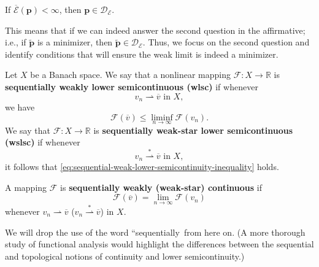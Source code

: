 \begin{Lemma}
\label{lem:elasticity-finite-extended-energy-admissibility}
If $\overline{\mathcal{E}}(\bm{p})<\infty$, then $\bm{p}\in\mathcal{D}_{\mathcal{E}}$.
\end{Lemma}

This means that if we can indeed answer the second question in the affirmative; i.e., if $\widetilde{\bm{p}}$ is a minimizer, then $\widetilde{\bm{p}}\in\mathcal{D}_{\mathcal{E}}$. Thus, we focus on the second question and identify conditions that will ensure the weak limit is indeed a minimizer.

\begin{Definition}
\label{def:sequential-weak-semicontinuity-and-continuity}
Let $X$ be a Banach space. We say that a nonlinear mapping $\mathcal{F}:X\to\mathbb{R}$ is \textbf{sequentially weakly lower semicontinuous (wlsc)} if whenever
\begin{equation}\label{eq:sequential-weak-lower-semicontinuity-sequence}
v_n\rightharpoonup\overline v\text{ in }X,
\end{equation}
we have
\begin{equation}\label{eq:sequential-weak-lower-semicontinuity-inequality}
\mathcal{F}(\overline v)\leq\liminf_{n\to\infty}\mathcal{F}(v_n).
\end{equation}
We say that $\mathcal{F}:X\to\mathbb{R}$ is \textbf{sequentially weak-star lower semicontinuous (wslsc)} if whenever
\begin{equation}\label{eq:sequential-weak-star-lower-semicontinuity-sequence}
v_n\overset{*}{\rightharpoonup}\overline v\text{ in }X,
\end{equation}
it follows that \eqref{eq:sequential-weak-lower-semicontinuity-inequality} holds.

A mapping $\mathcal{F}$ is \textbf{sequentially weakly (weak-star) continuous} if
\begin{equation}\label{eq:sequential-weak-continuity-functional-limit}
\mathcal{F}(\overline v)=\lim_{n\to\infty}\mathcal{F}(v_n)
\end{equation}
whenever $v_n\rightharpoonup\overline v$ ($v_n\overset{*}{\rightharpoonup}\overline v$) in $X$.
\end{Definition}

\begin{Remark}
\label{rem:sequential-semicontinuity-terminology-omission}
We will drop the use of the word ``sequentially\textquotesingle\textquotesingle\ from here on. (A more thorough study of functional analysis would highlight the differences between the sequential and topological notions of continuity and lower semicontinuity.)
\end{Remark}

